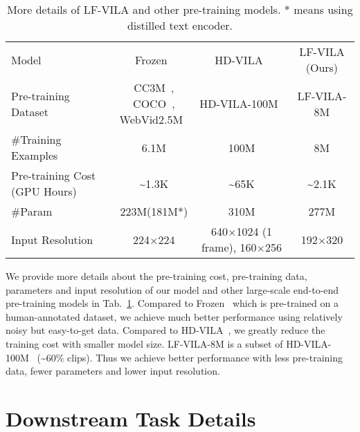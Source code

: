 \documentclass{article}
\begin{document}
\begin{table}[t]
    \small
    \centering
    \caption{More details of LF-VILA and other pre-training models. * means using distilled text encoder.}
    \begin{tabular}{l c c c} 
    \toprule
    Model &Frozen~\cite{bain2021frozen} & HD-VILA~\cite{xue2021hdvila} & LF-VILA (Ours)\\
    \cmidrule{1-4}
    Pre-training Dataset & \makecell[c]{CC3M~\cite{sharma2018conceptual},\\ COCO~\cite{chen2015mscoco},\\ WebVid2.5M~\cite{bain2021frozen}} &HD-VILA-100M~\cite{xue2021hdvila} & LF-VILA-8M \\
    \cmidrule{1-4}
    \#Training Examples & 6.1M & 100M & 8M\\
    \cmidrule{1-4}
    Pre-training Cost (GPU Hours) & \textasciitilde1.3K & \textasciitilde65K & \textasciitilde2.1K\\
    \cmidrule{1-4}
    \#Param & 223M(181M*) & 310M & 277M \\
    \cmidrule{1-4}
    Input Resolution & 224$\times$224 & \makecell[c]{640$\times$1024 (1 frame), \\ 160$\times$256} & 192$\times$320 \\
    \bottomrule
    \end{tabular}
    \label{tab:cost}
\end{table}
We provide more details about the pre-training cost, pre-training data, parameters and input resolution of our model and other large-scale end-to-end pre-training models in Tab.~\ref{tab:cost}.
Compared to Frozen~\cite{bain2021frozen} which is pre-trained on a human-annotated dataset, we achieve much better performance using relatively noisy but easy-to-get data. Compared to HD-VILA~\cite{xue2021hdvila}, we greatly reduce the training cost with smaller model size. LF-VILA-8M is a subset of HD-VILA-100M~\cite{xue2021hdvila} (\textasciitilde60\% clips). Thus we achieve better performance with less pre-training data, fewer parameters and lower input resolution.

\section{Downstream Task Details}\label{sec:app_tasks}
\end{document}
